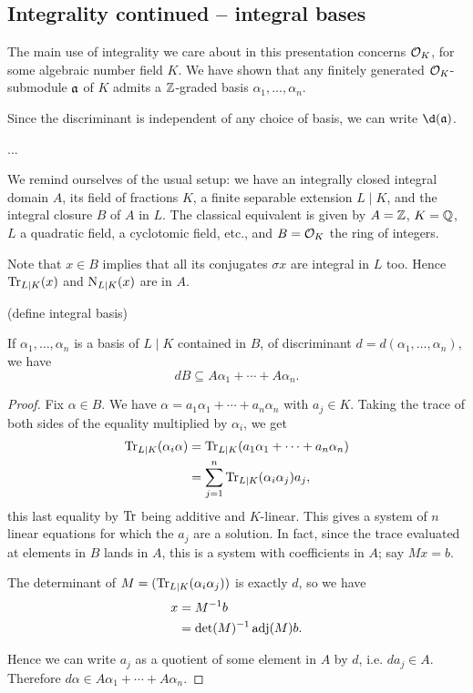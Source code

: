 \subsection{Integrality continued -- integral bases}


The main use of integrality we care about in this presentation concerns $\mathcal{O}_K$, for some algebraic number field $K$. We have shown that any finitely generated $\mathcal{O}_K$-submodule $\mathfrak{a}$ of $K$ admits a $\mathbb{Z}$-graded basis $\alpha_1,\dots,\alpha_n$.

Since the discriminant is independent of any choice of basis, we can write $\d(\fraka)$.

...

We remind ourselves of the usual setup: we have an integrally closed integral domain $A$, its field of fractions $K$, a finite separable extension $L\mid K$, and the integral closure $B$ of $A$ in $L$. The classical equivalent is given by $A=\mathbb{Z}$, $K=\mathbb{Q}$, $L$ a quadratic field, a cyclotomic field, etc., and $B=\mathcal{O}_K$ the ring of integers.

Note that $x\in B$ implies that all its conjugates $\sigma x$ are integral in $L$ too. Hence $\operatorname{Tr}_{L\mid K}(x)$ and $\operatorname{N}_{L\mid K}(x)$ are in $A$.

(define integral basis)

\begin{lem}
	If $\alpha_1,\dots,\alpha_n$ is a basis of $L\mid K$ contained in $B$, of discriminant $d=d(\alpha_1,\dots,\alpha_n)$, we have
	\[
		dB\subseteq A\alpha_1 + \cdots + A\alpha_n.
	\]
\end{lem}
\begin{proof}
	Fix $\alpha\in B$. We have $\alpha=a_1\alpha_1+\cdots+a_n\alpha_n$ with $a_j\in K$. Taking the trace of both sides of the equality multiplied by $\alpha_i$, we get
	\begin{align*}
		\operatorname{Tr}_{L\mid K}(\alpha_i \alpha) &= \operatorname{Tr}_{L\mid K}(a_1\alpha_1+\cdots+a_n\alpha_n)\\
			&= \sum_{j=1}^n \operatorname{Tr}_{L\mid K}(\alpha_i\alpha_j) a_j,
	\end{align*}
	this last equality by $\operatorname{Tr}$ being additive and $K$-linear. This gives a system of $n$ linear equations for which the $a_j$ are a solution. In fact, since the trace evaluated at elements in $B$ lands in $A$, this is a system with coefficients in $A$; say $Mx=b$.

	The determinant of $M=(\operatorname{Tr}_{L\mid K}(\alpha_i\alpha_j))$ is exactly $d$, so we have
	\begin{align*}
		x &= M^{-1} b\\
		  &= \det(M)^{-1}\operatorname{adj}(M)b.
	\end{align*}
	
	Hence we can write $a_j$ as a quotient of some element in $A$ by $d$, i.e. $da_j\in A$. Therefore $d\alpha\in A\alpha_1+\cdots+A\alpha_n$.
\end{proof}

